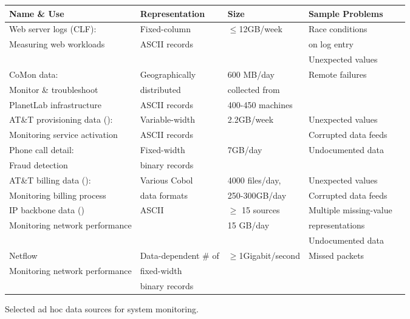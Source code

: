 \documentclass{sigplanconf}
\begin{document}
\begin{figure*}
\begin{center}
\begin{tabular}{|l|l|l|l|l|}
\hline
Name \& Use   &  Representation              &Size           & Sample Problems \\ \hline\hline
Web server logs (CLF): &  Fixed-column  & $\leq$12GB/week & Race conditions \\ 
Measuring web workloads         &  ASCII records &                 & on log entry \\
                                &                &                 & Unexpected values\\ \hline
CoMon data:              &  Geographically & 600 MB/day & Remote failures\\ 
Monitor \& troubleshoot  &  distributed    & collected from           &  \\
PlanetLab infrastructure &  ASCII records  & \appr{}400-450 machines           & \\\hline
AT\&T provisioning data (\dibbler{}): & Variable-width  & 2.2GB/week & Unexpected values \\ 
Monitoring service activation & ASCII records  &            & Corrupted data feeds \\ \hline
Phone call detail:   &  Fixed-width   &\appr{}7GB/day &  Undocumented data\\ 
Fraud detection & binary records & & \\  \hline 
AT\&T billing data (\ningaui{}): & Various Cobol  & \appr{}4000 files/day, & Unexpected values\\ 
Monitoring billing process   & data formats            & 250-300GB/day    & Corrupted data feeds \\ \hline
IP backbone data (\darkstar{})  & ASCII  & $\ge$ 15 sources  & Multiple missing-value \\
Monitoring network performance  &        & \appr{}15 GB/day              & representations  \\ 
                                &        &                               & Undocumented data \\\hline
Netflow       & Data-dependent \# of     & $\ge$1Gigabit/second  & Missed packets\\ 
Monitoring network performance              &  fixed-width    &                       & \\ 
               & binary records & & \\ \hline
\end{tabular}
\caption{Selected ad hoc data sources for system monitoring. }
\label{figure:data-sources}
\end{center}
\end{figure*}
\end{document}

